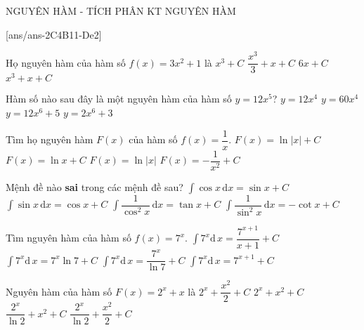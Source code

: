 \begin{name}
	{NGUYÊN HÀM - TÍCH PHÂN}
	{KT NGUYÊN HÀM}
	{\tentruong}
	{\thoigian}
\end{name}
\setcounter{ex}{0}\setcounter{bt}{0}
\TN
{}[ans/ans-2C4B11-De2]
\begin{ex}%
	Họ nguyên hàm của hàm số $f(x)=3x^2+1$ là
	\choice
	{$x^3+C$}
	{$\dfrac{x^3}{3}+x+C$}
	{$6x+C$}
	{\True $x^3+x+C$}
\end{ex} 
\begin{ex}%
	Hàm số nào sau đây là một nguyên hàm của hàm số $y=12x^5$?
	\choice
	{$y=12x^4$}
	{$y=60x^4$}
	{$y=12x^6+5$}
	{\True $y=2x^6+3$}
\end{ex} 
\begin{ex}%
	Tìm họ nguyên hàm $F(x)$ của hàm số $f(x)=\dfrac{1}{x}$.
	\choice
	{\True  $F(x)=\ln \left| x \right|+C$}
	{$F(x)=\ln x+C$}
	{$F(x)=\ln \left| x \right|$}
	{$F(x)=-\dfrac{1}{x^2}+C$}
\end{ex} 
\begin{ex}%
	Mệnh đề nào \textbf{sai} trong các mệnh đề sau?
	\choice
	{ $\displaystyle\int\cos x\,\mathrm{d}x=\sin x+C$}
	{\True $\displaystyle\int \sin x \, \mathrm{d}x=\cos x+C$}
	{$\displaystyle\int{\dfrac{1}{\cos^2x}\, \mathrm{d}x=\tan x+C}$}
	{$\displaystyle\int{\dfrac{1}{\sin^2x}\, \mathrm{d}x=-\cot x+C}$}
\end{ex} 
\begin{ex}%
	Tìm nguyên hàm của hàm số $f(x)=7^x$.
	\choice
	{$\displaystyle\int 7^x\mathrm{d}\,x=\dfrac{7^{x+1}}{x+1}+C$}
	{$\displaystyle\int 7^x\mathrm{d}\,x=7^x\ln 7+C$}
	{\True $\displaystyle\int 7^x \mathrm{d}\,x=\dfrac{7^x}{\ln 7}+C$}
	{$\displaystyle\int 7^x\mathrm{d}\,x=7^{x+1}+C$}
\end{ex} 
\begin{ex}%
	Nguyên hàm của hàm số $F(x)=2^x+x$ là
	\choice
	{ $2^x+\dfrac{x^2}{2}+C$}
	{$2^x+x^2+C$}
	{$\dfrac{2^x}{\ln 2}+x^2+C$}
	{\True $\dfrac{2^x}{\ln 2}+\dfrac{x^2}{2}+C$}
\end{ex} 
